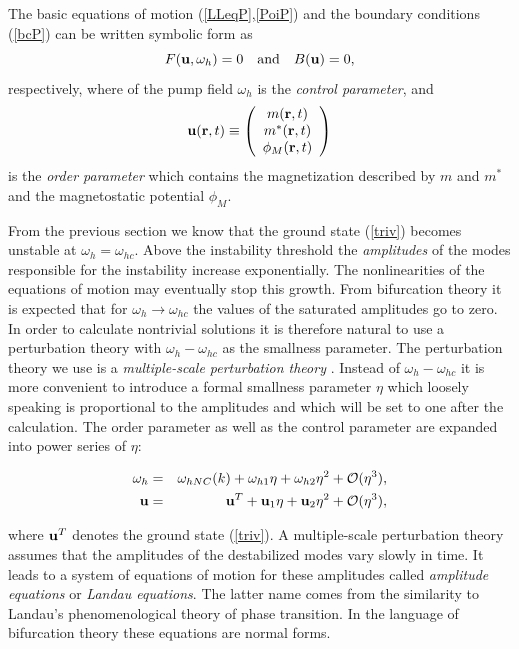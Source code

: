 The basic equations of motion (\ref{LLeqP},\ref{PoiP}) and 
the boundary conditions (\ref{bcP}) can be written symbolic form as
\begin{equation}
  F({\bf u},\omega_h)=0\quad\mbox{and}\quad B({\bf u})=0,
  \label{eqm}
\end{equation}
respectively, where of the pump field $\omega_h$ is the
{\em control parameter\/}, and
\begin{equation}
  {\bf u}({\bf r},t)\equiv\left(\begin{array}{c}m({\bf r},t)\\m^*(
   {\bf r},t)\\\phi_M({\bf r},t)\end{array}\right)
  \label{OP} 
\end{equation} 
is the {\em order parameter\/} which contains the magnetization
described by $m$ and $m^*$ and the magnetostatic potential $\phi_M$.

From the previous section we know that the ground state (\ref{triv})
becomes unstable at $\omega_h=\omega_{hc}$. Above the instability
threshold the {\em amplitudes\/} of the modes responsible for the
instability increase exponentially. The nonlinearities of the
equations of motion may eventually stop this growth. From bifurcation
theory it is expected that for $\omega_h\to\omega_{hc}$ the values of
the saturated amplitudes go to zero\cite{rem5}. In order to calculate
nontrivial solutions it is therefore natural to use a perturbation
theory with $\omega_h-\omega_{hc}$ as the smallness parameter.
The perturbation theory we use is a {\em multiple-scale perturbation 
theory\/} \cite{man.90,nay.73}. Instead of $\omega_h-\omega_{hc}$ it
is more convenient to introduce a formal smallness parameter $\eta$ 
which loosely speaking is proportional to the amplitudes and which
will be set to one after the calculation. The order parameter as well
as the control parameter are expanded into power series of $\eta$:
\begin{mathletters}\label{hu.pow}
\begin{eqnarray}
 \omega_h&=&\omega_{hNC}(k)+\omega_{h1}\eta+\omega_{h2}\eta^2+
   {\cal O}(\eta^3), \label{h.pow}\\
 {\bf u}&=&{\bf u}^T+{\bf u}_1\eta+{\bf u}_2\eta^2+{\cal O}(\eta^3),
   \label{u.pow}
\end{eqnarray}
\end{mathletters}
where ${\bf u}^T$ denotes the ground state (\ref{triv}). 
A multiple-scale perturbation theory assumes that the amplitudes of
the destabilized modes vary slowly in time. It leads to a system of 
equations of motion for these amplitudes called {\em
amplitude equations\/} or {\em Landau equations\/}. The latter name
comes from the similarity to Landau's phenomenological theory of phase
transition. In the language of bifurcation theory these equations are
normal forms.

